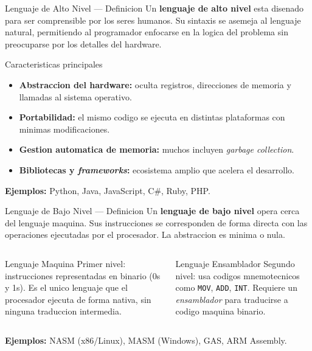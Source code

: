 \documentclass[10pt, aspectratio=169]{beamer}
\begin{document}
	\begin{frame}{Lenguaje de Alto Nivel --- Definicion}
		Un \textbf{lenguaje de alto nivel} esta disenado para ser comprensible por los seres
		humanos. Su sintaxis se asemeja al lenguaje natural, permitiendo al programador
		enfocarse en la logica del problema sin preocuparse por los detalles del hardware.
		\vspace{0.25cm}
		\begin{block}{Caracteristicas principales}
			\begin{itemize}
				\item \textbf{Abstraccion del hardware:} oculta registros, direcciones de memoria
				y llamadas al sistema operativo.
				\item \textbf{Portabilidad:} el mismo codigo se ejecuta en distintas plataformas
				con minimas modificaciones.
				\item \textbf{Gestion automatica de memoria:} muchos incluyen
				\textit{garbage collection}.
				\item \textbf{Bibliotecas y \textit{frameworks}:} ecosistema amplio que
				acelera el desarrollo.
			\end{itemize}
		\end{block}
		\vspace{0.2cm}
		\small \textbf{Ejemplos:} Python, Java, JavaScript, C\#, Ruby, PHP.
	\end{frame}
	
	\begin{frame}{Lenguaje de Bajo Nivel --- Definicion}
		Un \textbf{lenguaje de bajo nivel} opera cerca del lenguaje maquina. Sus instrucciones
		se corresponden de forma directa con las operaciones ejecutadas por el procesador.
		La abstraccion es minima o nula.
		\vspace{0.25cm}
		\begin{columns}
			\begin{block}{Lenguaje Maquina}
				Primer nivel: instrucciones representadas en binario (0s y 1s). Es el unico
				lenguaje que el procesador ejecuta de forma nativa, sin ninguna traduccion
				intermedia.
			\end{block}
			\begin{block}{Lenguaje Ensamblador}
				Segundo nivel: usa codigos mnemotecnicos como \texttt{MOV}, \texttt{ADD},
				\texttt{INT}. Requiere un \textit{ensamblador} para traducirse a codigo
				maquina binario.
			\end{block}
		\end{columns}
		\vspace{0.25cm}
		\small \textbf{Ejemplos:} NASM (x86/Linux), MASM (Windows), GAS, ARM Assembly.
	\end{frame}
	
\end{document}
